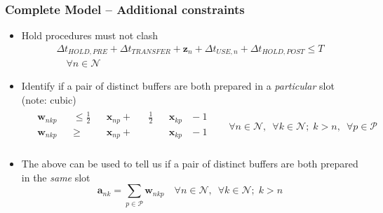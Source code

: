 \documentclass{beamer}
\begin{document}
\begin{frame}
    \frametitle{Complete Model -- Additional constraints}
    \begin{itemize}
        \item Hold procedures must not clash
        \begin{multline}
            \Delta t_{\mathit{HOLD,PRE}} + \Delta t_{\mathit{TRANSFER}}
            + \boldsymbol{z}_{n} + \Delta t_{\mathit{USE},n} 
            + \Delta t_{\mathit{HOLD,POST}} \le T\\ \quad \forall n \in 
            \mathcal{N}
        \end{multline}
        \item Identify if a pair of distinct buffers are both prepared in a
        \emph{particular} slot (note: cubic)
        \begin{equation}
            \begin{split}
                \begin{alignedat}{11}
                    &\boldsymbol{w}_{nkp} {}&&\le{} \tfrac{1}{2} 
                    &&\boldsymbol{x}_{np}
                    {}+{} &&\tfrac{1}{2} && \boldsymbol{x}_{kp} &{}-{} 1\\
                    &\boldsymbol{w}_{nkp} {}&&\ge{} &&\boldsymbol{x}_{np} {}+{}
                    && && \boldsymbol{x}_{kp} &{}-{} 1\\
                \end{alignedat}
            \end{split}
            \quad
            \begin{split}
                \forall n \in \mathcal{N}, \enspace \forall k \in \mathcal{N};
                \; k > n, \enspace \forall p \in \mathcal{P}
            \end{split}
            \label{eq.w1}
        \end{equation}
        \item The above can be used to tell us if  a pair of distinct buffers
        are both prepared in the \emph{same} slot
        \begin{equation}
            \boldsymbol{a}_{nk} = \sum_{p \in \mathcal{P}} \boldsymbol{w}_{nkp}
            \quad \forall n \in \mathcal{N}, \enspace \forall k \in 
            \mathcal{N}; \; k > n
            \label{eq.a1}
        \end{equation}
    \end{itemize}
\end{frame}
\end{document}
